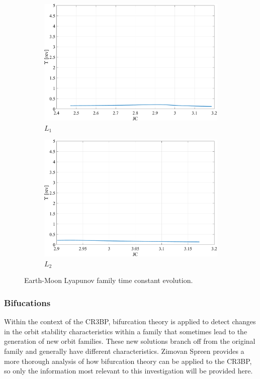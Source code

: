 \begin{figure}[H]
    \begin{subfigure}[h]{0.4\linewidth}
        \includegraphics[width=\textwidth]{figures/L1LyapunovTimeConstant.pdf}
        \caption{$L_{1}$}
    \end{subfigure}
    \hfill
    \begin{subfigure}[h]{0.4\linewidth}
        \includegraphics[width=\textwidth]{figures/L2LyapunovTimeConstant.pdf}
        \caption{$L_{2}$}
    \end{subfigure}
    \caption{Earth-Moon Lyapunov family time constant evolution.}
    \label{fig:timeConstant}
\end{figure}

\subsubsection{Bifucations}
Within the context of the CR3BP, bifurcation theory is applied to detect changes in the orbit
stability characteristics within a family that sometimes lead to the generation of new orbit
families. These new solutions branch off from the original family and generally have different
characteristics. Zimovan Spreen provides a more thorough analysis of how bifurcation theory can be
applied to the CR3BP, so only the information most relevant to this investigation will be provided
here\cite{ZimovanSpreen:2021}.

